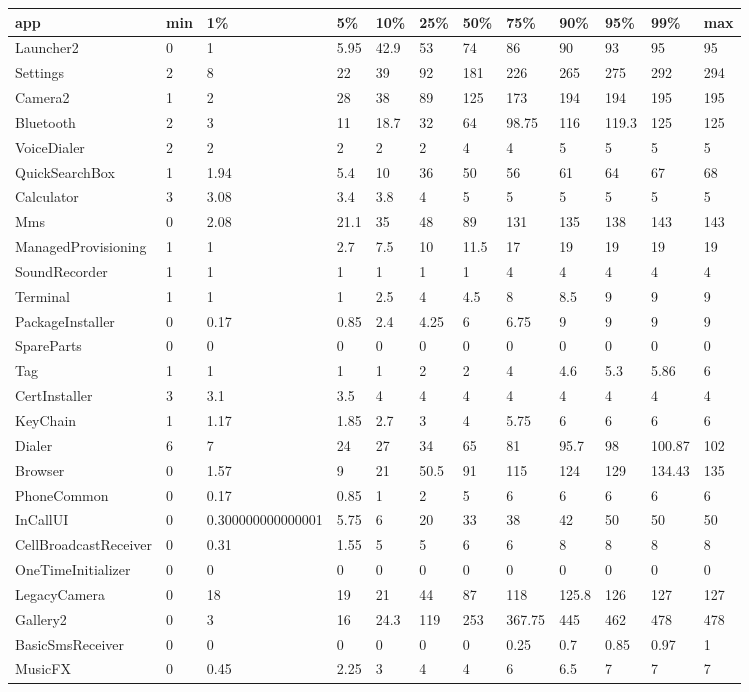 \begin{tabular}{|l|l|l|l|l|l|l|l|l|l|l|l|}
\hline
app&min&1\%&5\%&10\%&25\%&50\%&75\%&90\%&95\%&99\%&max\\
\hline
Launcher2&0&1&5.95&42.9&53&74&86&90&93&95&95\\
\hline
Settings&2&8&22&39&92&181&226&265&275&292&294\\
\hline
Camera2&1&2&28&38&89&125&173&194&194&195&195\\
\hline
Bluetooth&2&3&11&18.7&32&64&98.75&116&119.3&125&125\\
\hline
VoiceDialer&2&2&2&2&2&4&4&5&5&5&5\\
\hline
QuickSearchBox&1&1.94&5.4&10&36&50&56&61&64&67&68\\
\hline
Calculator&3&3.08&3.4&3.8&4&5&5&5&5&5&5\\
\hline
Mms&0&2.08&21.1&35&48&89&131&135&138&143&143\\
\hline
ManagedProvisioning&1&1&2.7&7.5&10&11.5&17&19&19&19&19\\
\hline
SoundRecorder&1&1&1&1&1&1&4&4&4&4&4\\
\hline
Terminal&1&1&1&2.5&4&4.5&8&8.5&9&9&9\\
\hline
PackageInstaller&0&0.17&0.85&2.4&4.25&6&6.75&9&9&9&9\\
\hline
SpareParts&0&0&0&0&0&0&0&0&0&0&0\\
\hline
Tag&1&1&1&1&2&2&4&4.6&5.3&5.86&6\\
\hline
CertInstaller&3&3.1&3.5&4&4&4&4&4&4&4&4\\
\hline
KeyChain&1&1.17&1.85&2.7&3&4&5.75&6&6&6&6\\
\hline
Dialer&6&7&24&27&34&65&81&95.7&98&100.87&102\\
\hline
Browser&0&1.57&9&21&50.5&91&115&124&129&134.43&135\\
\hline
PhoneCommon&0&0.17&0.85&1&2&5&6&6&6&6&6\\
\hline
InCallUI&0&0.300000000000001&5.75&6&20&33&38&42&50&50&50\\
\hline
CellBroadcastReceiver&0&0.31&1.55&5&5&6&6&8&8&8&8\\
\hline
OneTimeInitializer&0&0&0&0&0&0&0&0&0&0&0\\
\hline
LegacyCamera&0&18&19&21&44&87&118&125.8&126&127&127\\
\hline
Gallery2&0&3&16&24.3&119&253&367.75&445&462&478&478\\
\hline
BasicSmsReceiver&0&0&0&0&0&0&0.25&0.7&0.85&0.97&1\\
\hline
MusicFX&0&0.45&2.25&3&4&4&6&6.5&7&7&7\\

\end{tabular}
